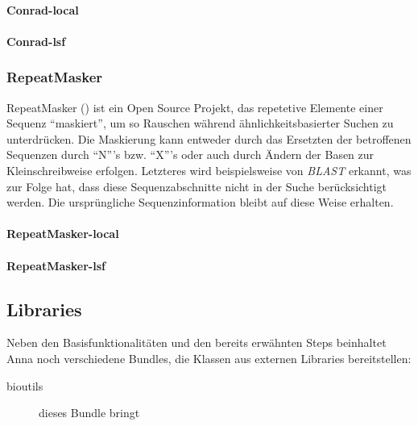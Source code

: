 \paragraph{Conrad-local}
\paragraph{Conrad-lsf}
\subsubsection{RepeatMasker}
RepeatMasker
()
ist ein Open Source Projekt, das repetetive Elemente einer Sequenz
\enquote{maskiert}, um so Rauschen während ähnlichkeitsbasierter Suchen zu
unterdrücken.
Die Maskierung kann entweder durch das Ersetzten der betroffenen Sequenzen
durch \enquote{N}'s bzw. \enquote{X}'s oder auch durch Ändern der Basen zur
Kleinschreibweise erfolgen.
Letzteres wird beispielsweise von \textit{BLAST} erkannt, was zur Folge hat,
dass diese Sequenzabschnitte nicht in der Suche berücksichtigt werden.
Die ursprüngliche Sequenzinformation bleibt auf diese Weise	erhalten.

\paragraph{RepeatMasker-local}

\paragraph{RepeatMasker-lsf}

\subsection{Libraries}
Neben den Basisfunktionalitäten und den bereits erwähnten Steps
beinhaltet Anna noch verschiedene Bundles, die Klassen aus externen Libraries
bereitstellen:
\begin{description}
\item[bioutils] dieses Bundle bringt 
\end{description}
